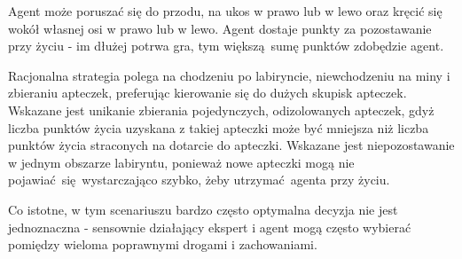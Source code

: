 Agent może poruszać się do przodu, na ukos w prawo lub w lewo oraz kręcić się wokół własnej osi w prawo lub w lewo. Agent dostaje punkty za pozostawanie przy życiu - im dłużej potrwa gra, tym większą sumę punktów zdobędzie agent.

Racjonalna strategia polega na chodzeniu po labiryncie, niewchodzeniu na miny i zbieraniu apteczek, preferując kierowanie się do dużych skupisk apteczek. Wskazane jest unikanie zbierania pojedynczych, odizolowanych apteczek, gdyż liczba punktów życia uzyskana z takiej apteczki może być mniejsza niż liczba punktów życia straconych na dotarcie do apteczki. Wskazane jest niepozostawanie w jednym obszarze labiryntu, ponieważ nowe apteczki mogą nie pojawiać się wystarczająco szybko, żeby utrzymać agenta przy życiu.

Co istotne, w tym scenariuszu bardzo często optymalna decyzja nie jest jednoznaczna - sensownie działający ekspert i agent mogą często wybierać pomiędzy wieloma poprawnymi drogami i zachowaniami.

\begin{figure}[H]
	\begin{floatrow}
	\end{floatrow}
\end{figure}
